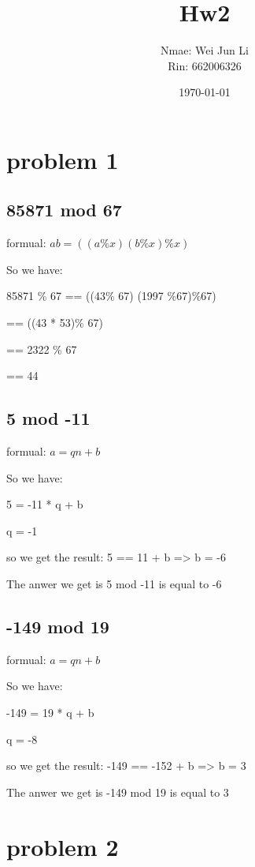 \documentclass[9pt]{article}
\title{Hw2}
\author{Nmae: Wei Jun Li \\ Rin: 662006326}
\date{\today}
\begin{document}
\begin{CJK*}{UTF8}{gbsn}    

\maketitle                  

\section{problem 1}
\subsection{ 85871 mod 67}
    formual: $a b = ((a \% x)(b \% x) \% x)$

    So we have:
    
    85871 \% 67 == ((43\% 67) (1997 \%67)\%67)

\hspace*{2 cm}  == ((43 * 53)\% 67)

\hspace*{2 cm}  == 2322 \% 67

\hspace*{2 cm}  == 44

\subsection{ 5 mod -11}
    formual: $a = qn + b $

    So we have:
    
    5 = -11 * q + b

    q = -1

    so we get the result: 5 == 11 + b => b = -6
    
    The anwer we get is  5 mod -11 is equal to -6

\subsection{-149 mod 19}
    formual: $a = qn + b $

    So we have:
    
    -149 = 19 * q + b

    q = -8

    so we get the result: -149 == -152 + b => b = 3
    
    The anwer we get is  -149 mod 19 is equal to 3

\newpage

\section{problem 2}


\end{CJK*}
\end{document}
